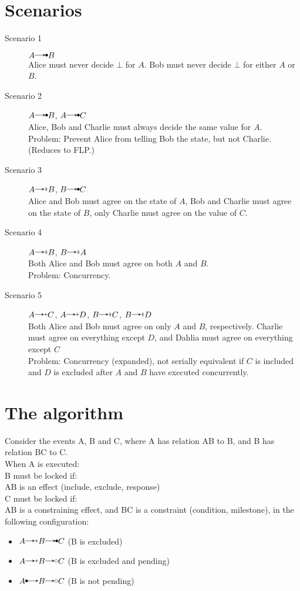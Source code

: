 \documentclass{article}
\begin{document}
	\section*{Scenarios} %
	\begin{description}
		\item[Scenario 1] 
			$A\crel B$\\
			Alice must never decide $\bot$ for $A$. Bob must never decide $\bot$ for either $A$ or $B$.
		\item[Scenario 2]
			$A\crel B$, $A\crel C$\\
			Alice, Bob and Charlie must always decide the same value for $A$.\\
			Problem: Prevent Alice from telling Bob the state, but not Charlie. (Reduces to FLP.)
		\item[Scenario 3]
			$A\erel B$, $B\crel C$\\
			Alice and Bob must agree on the state of $A$, Bob and Charlie must agree on the state of $B$, only Charlie must agree on the value of $C$.
		\item[Scenario 4]
			$A\erel B$, $B\erel A$\\
			Both Alice and Bob must agree on both $A$ and $B$.\\
			Problem: Concurrency.
		\item[Scenario 5]
			$A\irel C$, $A\irel D$, $B\erel C$, $B\erel D$\\
			Both Alice and Bob must agree on only $A$ and $B$, respectively. Charlie must agree on everything except $D$, and Dahlia must agree on everything except $C$\\
			Problem: Concurrency (expanded), not serially equivalent if $C$ is included and $D$ is excluded after $A$ and $B$ have executed concurrently.			
	\end{description}


	\section{The algorithm}
	Consider the events A, B and C, where A has relation AB to B, and B has relation BC to C.\\
	When A is executed:\\
	B must be locked if:\\
	AB is an effect (include, exclude, response)\\
	C must be locked if:\\
	AB is a constraining effect, and BC is a constraint (condition, milestone), in the following configuration:\\
	\begin{itemize}
		\item $A \irel B \crel C$ (B is excluded)
		\item $A \irel B \mrel C$ (B is excluded and pending)
		\item $A \rrel B \mrel C$ (B is not pending)
	\end{itemize}
\end{document}
